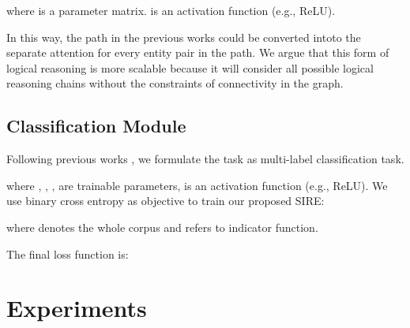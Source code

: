 \documentclass[11pt,a4paper]{article}
\begin{document}
where   is a parameter matrix.  is an activation function (e.g., ReLU).

In this way, the path in the previous works could be converted intoto the separate attention for every entity pair in the path. We argue that this form of logical reasoning is more scalable because it will consider all possible logical reasoning chains without the constraints of connectivity in the graph. 


\subsection{Classification Module\label{ssec:classification}}
Following previous works \citep{DocRED-paper,GAIN}, we formulate the task as multi-label classification task.

where , , ,  are trainable parameters,  is an activation function (e.g., ReLU). We use binary cross entropy as objective to train our proposed SIRE:

where  denotes the whole corpus and  refers to indicator function.

The final loss function is:

\fi \section{Experiments}
\end{document}
